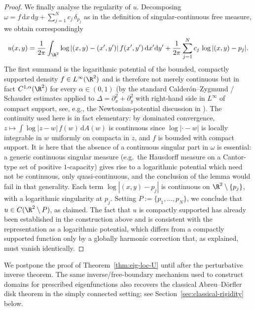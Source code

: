 \begin{proof}
We finally analyse the regularity of $u$. Decomposing
$\omega = f\,\mathrm{d}x\,\mathrm{d}y+\sum_{j=1}^N c_j\,\delta_{p_j}$ as in
the definition of singular-continuous free measure, we obtain
correspondingly
\[
u(x,y)=\frac{1}{2\pi}\int_{\R^2}\log|(x,y)-(x',y')|\,f(x',y')\,
\mathrm{d}x'\mathrm{d}y'
+\frac{1}{2\pi}\sum_{j=1}^N c_j\,\log|(x,y)-p_j|.
\]
The first summand is the logarithmic potential of the bounded, compactly
supported density \(f\in L^\infty(\R^2)\) and is therefore not merely
continuous but in fact $C^{1,\alpha}(\R^2)$ for every $\alpha\in(0,1)$
(by the standard Calder\'on--Zygmund / Schauder estimates applied to
$\Delta=\partial_x^2+\partial_y^2$ with right-hand side in $L^\infty$
of compact support, see, e.g., the Newtonian-potential discussion in
\cite{Hormander}).
The continuity used here is in fact elementary: by dominated convergence,
$z\mapsto \int \log|z-w|\,f(w)\,\mathrm{d}A(w)$ is continuous since
$\log|\cdot-w|$ is locally integrable in $w$ uniformly on compacta in $z$,
and $f$ is bounded with compact support. It is here that the absence of a continuous
singular part in $\omega$ is essential: a generic continuous singular
measure (e.g.\ the Hausdorff measure on a Cantor-type set of positive
$1$-capacity) gives rise to a logarithmic potential which need not be
continuous, only quasi-continuous, and the conclusion of the lemma would
fail in that generality. Each term $\log|(x,y)-p_j|$ is continuous on
$\R^2\setminus\{p_j\}$, with a logarithmic singularity at $p_j$. Setting
$P:=\{p_1,\ldots,p_N\}$, we conclude that $u\in C(\R^2\setminus P)$, as
claimed. The fact that $u$ is compactly supported has already been
established in the construction above and is consistent with the
representation as a logarithmic potential, which differs from a compactly
supported function only by a globally harmonic correction that, as
explained, must vanish identically.
\end{proof}

We postpone the proof of Theorem~\ref{thm:eig-loc-U} until after the
perturbative inverse theorem. The same inverse/free-boundary mechanism used
to construct domains for prescribed eigenfunctions also recovers the
classical Abreu--D\"orfler disk theorem in the simply connected setting; see
Section~\ref{sec:classical-rigidity} below.


